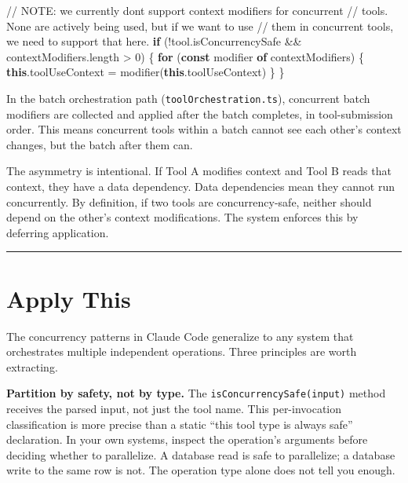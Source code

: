 \documentclass[
  english,
  11pt,
  letterpaper,
]{book}
\newenvironment{Shaded}{\begin{snugshade}}{\end{snugshade}}
\newcommand{\AlertTok}[1]{\textcolor[rgb]{0.68,0.00,0.00}{#1}}
\newcommand{\AttributeTok}[1]{\textcolor[rgb]{0.40,0.45,0.13}{#1}}
\newcommand{\CommentTok}[1]{\textcolor[rgb]{0.37,0.37,0.37}{#1}}
\newcommand{\ControlFlowTok}[1]{\textcolor[rgb]{0.00,0.23,0.31}{\textbf{#1}}}
\newcommand{\DecValTok}[1]{\textcolor[rgb]{0.68,0.00,0.00}{#1}}
\newcommand{\FunctionTok}[1]{\textcolor[rgb]{0.28,0.35,0.67}{#1}}
\newcommand{\KeywordTok}[1]{\textcolor[rgb]{0.00,0.23,0.31}{\textbf{#1}}}
\newcommand{\NormalTok}[1]{\textcolor[rgb]{0.00,0.23,0.31}{#1}}
\newcommand{\OperatorTok}[1]{\textcolor[rgb]{0.37,0.37,0.37}{#1}}
\begin{document}
\begin{Shaded}
\begin{Highlighting}[]
\CommentTok{// }\AlertTok{NOTE}\CommentTok{: we currently don\textquotesingle{}t support context modifiers for concurrent}
\CommentTok{//       tools. None are actively being used, but if we want to use}
\CommentTok{//       them in concurrent tools, we need to support that here.}
\ControlFlowTok{if}\NormalTok{ (}\OperatorTok{!}\NormalTok{tool}\OperatorTok{.}\AttributeTok{isConcurrencySafe} \OperatorTok{\&\&}\NormalTok{ contextModifiers}\OperatorTok{.}\AttributeTok{length} \OperatorTok{\textgreater{}} \DecValTok{0}\NormalTok{) \{}
  \ControlFlowTok{for}\NormalTok{ (}\KeywordTok{const}\NormalTok{ modifier }\KeywordTok{of}\NormalTok{ contextModifiers) \{}
    \KeywordTok{this}\OperatorTok{.}\AttributeTok{toolUseContext} \OperatorTok{=} \FunctionTok{modifier}\NormalTok{(}\KeywordTok{this}\OperatorTok{.}\AttributeTok{toolUseContext}\NormalTok{)}
\NormalTok{  \}}
\NormalTok{\}}
\end{Highlighting}
\end{Shaded}

In the batch orchestration path (\texttt{toolOrchestration.ts}),
concurrent batch modifiers are collected and applied after the batch
completes, in tool-submission order. This means concurrent tools within
a batch cannot see each other's context changes, but the batch after
them can.

The asymmetry is intentional. If Tool A modifies context and Tool B
reads that context, they have a data dependency. Data dependencies mean
they cannot run concurrently. By definition, if two tools are
concurrency-safe, neither should depend on the other's context
modifications. The system enforces this by deferring application.

\begin{center}\rule{0.5\linewidth}{0.5pt}\end{center}

\section{Apply This}\label{apply-this-4}

The concurrency patterns in Claude Code generalize to any system that
orchestrates multiple independent operations. Three principles are worth
extracting.

\textbf{Partition by safety, not by type.} The
\texttt{isConcurrencySafe(input)} method receives the parsed input, not
just the tool name. This per-invocation classification is more precise
than a static ``this tool type is always safe'' declaration. In your own
systems, inspect the operation's arguments before deciding whether to
parallelize. A database read is safe to parallelize; a database write to
the same row is not. The operation type alone does not tell you enough.
\end{document}
